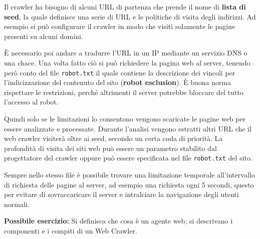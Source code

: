 Il crawler ha bisogno di alcuni URL di partenza che prende il nome di \textbf{lista di seed}, la quale definisce una serie di URL e le politiche di visita degli indirizzi.
Ad esempio si può configurare il crawler in modo che visiti solamente le pagine presenti su alcuni domini.

\`E necessario poi andare a tradurre l'URL in un IP mediante un servizio DNS o una chace. Una volta fatto ciò si può richiedere la pagina web al server, tenendo però conto del file \texttt{robot.txt} il quale contiene la descrizione dei vincoli per l'indicizzazione del contenuto del sito (\textbf{robot esclusion}).
\`E buona norma rispettare le restrizioni, perché altrimenti il server potrebbe bloccare del tutto l'accesso al robot.

Quindi solo se le limitazioni lo consentono vengono scaricate le pagine web per essere analizzate e processate. Durante l'analisi vengono estratti altri URL che il web crawler visiterà oltre ai seed, secondo un certa coda di priorità.
La profondità di visita dei siti web può essere un parametro stabilito dal progettatore del crawler oppure può essere specificata nel file \texttt{robot.txt} del sito.

Sempre nello stesso file è possibile trovare una limitazione temporale all'intervallo di richiesta delle pagine al server, ad esempio una richiesta ogni 5 secondi, questo per evitare di sovraccaricare il server e intralciare la navigazione degli utenti normali.

\textbf{{\color{Red} Possibile esercizio:}} Si definisca che cosa è un agente web; si descrivano i componenti e i compiti di un Web Crawler.


















